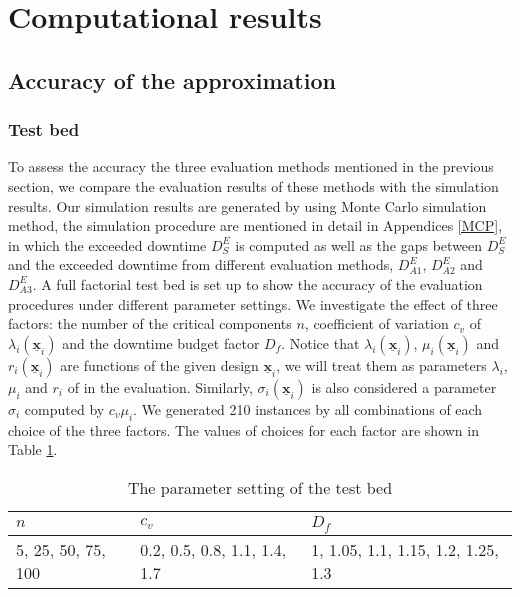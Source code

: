 \documentclass[preprint,12pt]{elsarticle}
\begin{document}
\section{Computational results}
\label{sec:numerical results}

\subsection{Accuracy of the approximation}
\subsubsection{Test bed}
To assess the accuracy the three evaluation methods mentioned in the previous section, we compare the evaluation results of these methods with the simulation results. Our simulation results are generated by using Monte Carlo simulation method, the simulation procedure are mentioned in detail in Appendices \ref{MCP}, in which the exceeded downtime $D^{E}_{S}$ is computed as well as the gaps between $D^{E}_S$ and the exceeded downtime from different evaluation methods, $D^{E}_{A1}$, $D^{E}_{A2}$ and $D^{E}_{A3}$. A full factorial test bed is set up to show the accuracy of the evaluation procedures under different parameter settings. We investigate the effect of three factors: the number of the critical components $n$, coefficient of variation $c_{v}$ of $\lambda_{i}(\underline{\boldsymbol{x}}_{i})$ and the downtime budget factor $D_{f}$. Notice that $\lambda_{i}(\underline{\boldsymbol{x}}_{i})$,   $\mu_{i}(\underline{\boldsymbol{x}}_{i})$ and $r_{i}(\underline{\boldsymbol{x}}_{i})$ are functions of the given design $\underline{\boldsymbol{x}}_{i}$, we will treat them as parameters $\lambda_{i}$, $\mu_{i}$ and $r_{i}$ of in the evaluation. Similarly, $\sigma_{i}(\underline{\boldsymbol{x}}_{i})$ is also considered a parameter $\sigma_{i}$ computed by $c_{v}\mu_{i}$. We generated 210 instances by all combinations of each choice of the three factors. The values of choices for each factor are shown in Table \ref{tab:evaluationtestbedps}. %
\begin{table}[htbp]
\small
  \centering
  \caption{The parameter setting of the test bed}
    \begin{tabular}{lll}
    \toprule
  $n$ & $c_{v}$ & $D_{f}$\\
    \midrule
    5, 25, 50, 75, 100 & 0.2, 0.5, 0.8, 1.1, 1.4, 1.7 & 1, 1.05, 1.1, 1.15, 1.2, 1.25, 1.3 \\
  \bottomrule
    \end{tabular}%
  \label{tab:evaluationtestbedps}%
\end{table}
\end{document}
